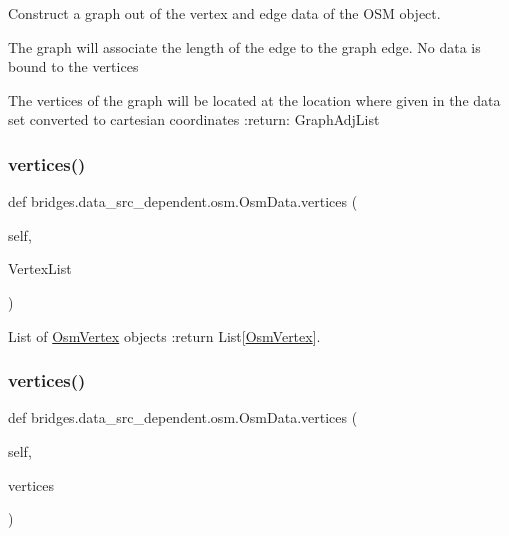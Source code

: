 Construct a graph out of the vertex and edge data of the O\+SM object. 

The graph will associate the length of the edge to the graph edge. No data is bound to the vertices

The vertices of the graph will be located at the location where given in the data set converted to cartesian coordinates \+:return\+: Graph\+Adj\+List \mbox{\label{classbridges_1_1data__src__dependent_1_1osm_1_1_osm_data_a9d254d1ef4043909d4d2bd4427daae39}} 
\subsubsection{\texorpdfstring{vertices()}{vertices()}\hspace{0.1cm}{\footnotesize\ttfamily [1/3]}}
{\footnotesize\ttfamily def bridges.\+data\+\_\+src\+\_\+dependent.\+osm.\+Osm\+Data.\+vertices (\begin{DoxyParamCaption}\item[{}]{self,  }\item[{}]{Vertex\+List }\end{DoxyParamCaption})}



List of \mbox{\hyperlink{classbridges_1_1data__src__dependent_1_1osm_1_1_osm_vertex}{Osm\+Vertex}} objects \+:return List\mbox{[}\mbox{\hyperlink{classbridges_1_1data__src__dependent_1_1osm_1_1_osm_vertex}{Osm\+Vertex}}\mbox{]}. 

\mbox{\label{classbridges_1_1data__src__dependent_1_1osm_1_1_osm_data_aaf96716b8b7e7c5810d8858cb3463a8d}} 
\subsubsection{\texorpdfstring{vertices()}{vertices()}\hspace{0.1cm}{\footnotesize\ttfamily [2/3]}}
{\footnotesize\ttfamily def bridges.\+data\+\_\+src\+\_\+dependent.\+osm.\+Osm\+Data.\+vertices (\begin{DoxyParamCaption}\item[{}]{self,  }\item[{}]{vertices }\end{DoxyParamCaption})}

